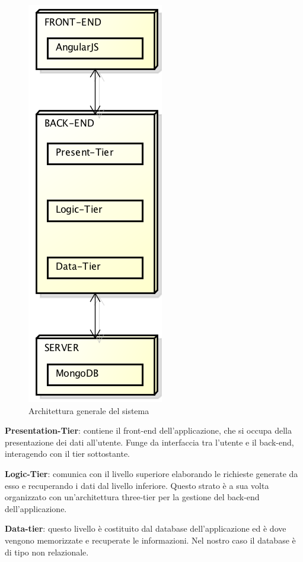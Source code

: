\begin{figure}[h]
	\centering
	\includegraphics[height=0.6\textheight]{img/architettura_generale}
	\caption[Architettura generale del sistema]{Architettura generale del sistema}
\end{figure}

\textbf{Presentation-Tier}: contiene il \gls{front-end} dell'applicazione, che si occupa della presentazione dei dati all'utente. Funge da interfaccia tra l'utente e il \gls{back-end}, interagendo con il tier sottostante.

\textbf{Logic-Tier}: comunica con il livello superiore elaborando le richieste generate da esso e recuperando i dati dal livello inferiore. Questo strato è a sua volta organizzato con un'architettura three-tier per la gestione del \gls{back-end} dell'applicazione.

\textbf{Data-tier}: questo livello è costituito dal \gls{database} dell'applicazione ed è dove vengono memorizzate e recuperate le informazioni. Nel nostro caso il \gls{database} è di tipo non relazionale.
